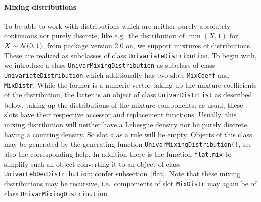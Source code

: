 \documentclass[11pt]{article}
\newcommand{\code}[1]{{\tt #1}}
\begin{document}
\paragraph{Mixing distributions}

To be able to work with distributions which are neither purely absolutely continuous
nor purely discrete, like e.g.\ the distribution of $\min(X,1)$ for
$X\sim{\cal N}(0,1)$, from package version 2.0 on, we support mixtures of
distributions. These are realized as subclasses of class \code{UnivariateDistribution}.
To begin with, we introduce a class \code{UnivarMixingDistribution} as subclass of
class \code{UnivariateDistribution} which additionally has two slots \code{MixCoeff}
and \code{MixDistr}. While the former is a numeric vector taking up the mixture
coefficients of the distribution, the latter is an object of class
\code{UnivarDistrList} as described below, taking up the distributions of the
mixture components; as usual, these slots have their respective accessor and
replacement functions. Usually, this mixing distribution will neither have
a Lebesgue density nor be purely discrete, having a counting density. So slot
\code{d} as a rule will be empty. Objects of this class may be generated by
the generating function \code{UnivarMixingDistribution()},  see also
the corresponding help. In addition there is the function \code{flat.mix}
to simplify such an object converting it to an object of class
\code{UnivarLebDecDistribution}; confer subsection~\ref{flat}.
Note that these mixing distributions may be recursive, i.e.\ compoments of
slot \code{MixDistr} may again
be of class \code{UnivarMixingDistribution}.
\end{document}
